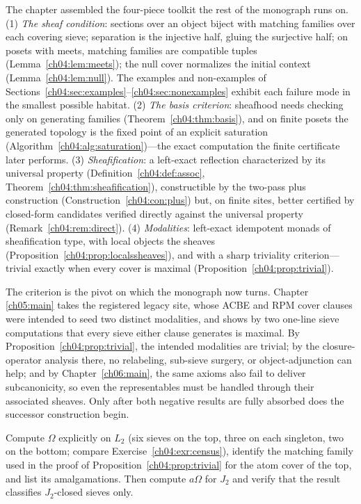 The chapter assembled the four-piece toolkit the rest of the monograph runs
on. (1) \emph{The sheaf condition}: sections over an object biject with
matching families over each covering sieve; separation is the injective half,
gluing the surjective half; on posets with meets, matching families are
compatible tuples (Lemma~\ref{ch04:lem:meets}); the null cover normalizes the
initial context (Lemma~\ref{ch04:lem:null}). The examples and non-examples of
Sections~\ref{ch04:sec:examples}--\ref{ch04:sec:nonexamples} exhibit each
failure mode in the smallest possible habitat. (2) \emph{The basis
criterion}: sheafhood needs checking only on generating families
(Theorem~\ref{ch04:thm:basis}), and on finite posets the generated topology
is the fixed point of an explicit saturation
(Algorithm~\ref{ch04:alg:saturation})---the exact computation the finite
certificate later performs. (3) \emph{Sheafification}: a left-exact
reflection characterized by its universal property
(Definition~\ref{ch04:def:assoc}, Theorem~\ref{ch04:thm:sheafification}),
constructible by the two-pass plus construction
(Construction~\ref{ch04:con:plus}) but, on finite sites, better certified by
closed-form candidates verified directly against the universal property
(Remark~\ref{ch04:rem:direct}). (4) \emph{Modalities}: left-exact idempotent
monads of sheafification type, with local objects the sheaves
(Proposition~\ref{ch04:prop:localssheaves}), and with a sharp triviality
criterion---trivial exactly when every cover is maximal
(Proposition~\ref{ch04:prop:trivial}).

The criterion is the pivot on which the monograph now turns. Chapter
\ref{ch05:main} takes the registered legacy site, whose ACBE and RPM cover
clauses were intended to seed two distinct modalities, and shows by two
one-line sieve computations that every sieve either clause generates is
maximal. By Proposition~\ref{ch04:prop:trivial}, the intended modalities are
trivial; by the closure-operator analysis there, no relabeling, sub-sieve
surgery, or object-adjunction can help; and by
Chapter~\ref{ch06:main}, the same axioms also fail to deliver subcanonicity,
so even the representables must be handled through their associated sheaves.
Only after both negative results are fully absorbed does the successor
construction begin.

\begin{exercise}\label{ch04:exr:omega}
Compute $\Omega$ explicitly on $L_2$ (six sieves on the top, three on each
singleton, two on the bottom; compare Exercise~\ref{ch04:exr:census}),
identify the matching family used in the proof of
Proposition~\ref{ch04:prop:trivial} for the atom cover of the top, and list
its amalgamations. Then compute $a\Omega$ for $J_2$ and verify that the
result classifies $J_2$-closed sieves only.
\end{exercise}

